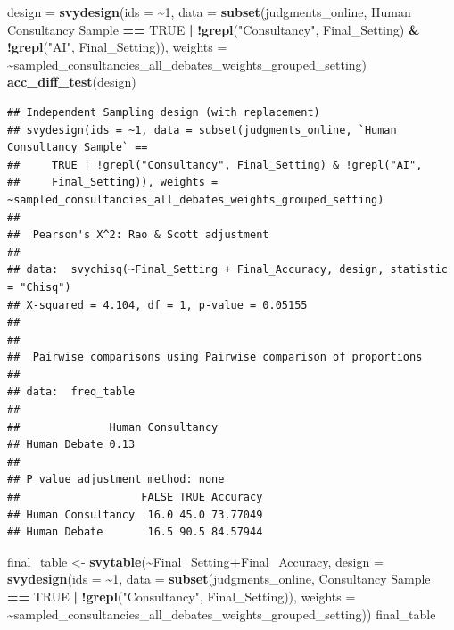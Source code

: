 \documentclass[
]{article}
\newenvironment{Shaded}{\begin{snugshade}}{\end{snugshade}}
\newcommand{\AttributeTok}[1]{\textcolor[rgb]{0.13,0.29,0.53}{#1}}
\newcommand{\ConstantTok}[1]{\textcolor[rgb]{0.56,0.35,0.01}{#1}}
\newcommand{\DecValTok}[1]{\textcolor[rgb]{0.00,0.00,0.81}{#1}}
\newcommand{\FunctionTok}[1]{\textcolor[rgb]{0.13,0.29,0.53}{\textbf{#1}}}
\newcommand{\NormalTok}[1]{#1}
\newcommand{\OtherTok}[1]{\textcolor[rgb]{0.56,0.35,0.01}{#1}}
\newcommand{\SpecialCharTok}[1]{\textcolor[rgb]{0.81,0.36,0.00}{\textbf{#1}}}
\newcommand{\StringTok}[1]{\textcolor[rgb]{0.31,0.60,0.02}{#1}}
\begin{document}
\begin{Shaded}
\begin{Highlighting}[]
\NormalTok{design }\OtherTok{=} \FunctionTok{svydesign}\NormalTok{(}\AttributeTok{ids =} \SpecialCharTok{\textasciitilde{}}\DecValTok{1}\NormalTok{, }\AttributeTok{data =} \FunctionTok{subset}\NormalTok{(judgments\_online, }\StringTok{\textasciigrave{}}\AttributeTok{Human Consultancy Sample}\StringTok{\textasciigrave{}} \SpecialCharTok{==} \ConstantTok{TRUE} \SpecialCharTok{|} \SpecialCharTok{!}\FunctionTok{grepl}\NormalTok{(}\StringTok{"Consultancy"}\NormalTok{, Final\_Setting) }\SpecialCharTok{\&} \SpecialCharTok{!}\FunctionTok{grepl}\NormalTok{(}\StringTok{"AI"}\NormalTok{, Final\_Setting)), }\AttributeTok{weights =} \SpecialCharTok{\textasciitilde{}}\NormalTok{sampled\_consultancies\_all\_debates\_weights\_grouped\_setting)}
\FunctionTok{acc\_diff\_test}\NormalTok{(design)}
\end{Highlighting}
\end{Shaded}

\begin{verbatim}
## Independent Sampling design (with replacement)
## svydesign(ids = ~1, data = subset(judgments_online, `Human Consultancy Sample` == 
##     TRUE | !grepl("Consultancy", Final_Setting) & !grepl("AI", 
##     Final_Setting)), weights = ~sampled_consultancies_all_debates_weights_grouped_setting)
## 
##  Pearson's X^2: Rao & Scott adjustment
## 
## data:  svychisq(~Final_Setting + Final_Accuracy, design, statistic = "Chisq")
## X-squared = 4.104, df = 1, p-value = 0.05155
## 
## 
##  Pairwise comparisons using Pairwise comparison of proportions 
## 
## data:  freq_table 
## 
##              Human Consultancy
## Human Debate 0.13             
## 
## P value adjustment method: none 
##                   FALSE TRUE Accuracy
## Human Consultancy  16.0 45.0 73.77049
## Human Debate       16.5 90.5 84.57944
\end{verbatim}

\begin{Shaded}
\begin{Highlighting}[]
\NormalTok{final\_table }\OtherTok{\textless{}{-}} \FunctionTok{svytable}\NormalTok{(}\SpecialCharTok{\textasciitilde{}}\NormalTok{Final\_Setting}\SpecialCharTok{+}\NormalTok{Final\_Accuracy, }
                        \AttributeTok{design =} \FunctionTok{svydesign}\NormalTok{(}\AttributeTok{ids =} \SpecialCharTok{\textasciitilde{}}\DecValTok{1}\NormalTok{, }
                                           \AttributeTok{data =} \FunctionTok{subset}\NormalTok{(judgments\_online, }\StringTok{\textasciigrave{}}\AttributeTok{Consultancy Sample}\StringTok{\textasciigrave{}} \SpecialCharTok{==} \ConstantTok{TRUE} \SpecialCharTok{|} \SpecialCharTok{!}\FunctionTok{grepl}\NormalTok{(}\StringTok{"Consultancy"}\NormalTok{, Final\_Setting)),}
                                           \AttributeTok{weights =} \SpecialCharTok{\textasciitilde{}}\NormalTok{sampled\_consultancies\_all\_debates\_weights\_grouped\_setting))}
\NormalTok{final\_table}
\end{Highlighting}
\end{Shaded}
\end{document}
